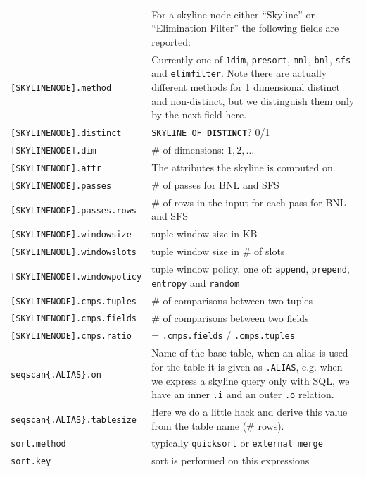 \begin{table}[htbp]
\begin{tabular*}{\textwidth}{@{\extracolsep{\fill}}p{\fixedcolumnwidth}@{\extracolsep{\fill}}p{\paragraphcolumnwidth}}
\hline
					& For a skyline node either ``Skyline'' or ``Elimination Filter'' the following fields are reported: \\
\verb|[SKYLINENODE].method|		& Currently one of \texttt{1dim}, \texttt{presort}, \texttt{mnl}, \texttt{bnl}, \texttt{sfs} and \texttt{elimfilter}. Note there are actually different methods for 1 dimensional distinct and non-distinct, but we distinguish them only by the next field here.\\
\verb|[SKYLINENODE].distinct|		& \texttt{SKYLINE OF \textbf{DISTINCT}}? 0/1\\
\verb|[SKYLINENODE].dim|		& \# of dimensions: $1, 2, \ldots$ \\
\verb|[SKYLINENODE].attr|		& The attributes the skyline is computed on.\\
\verb|[SKYLINENODE].passes|		& \# of passes for BNL and SFS\\
\verb|[SKYLINENODE].passes.rows|	& \# of rows in the input for each pass for BNL and SFS\\
\verb|[SKYLINENODE].windowsize|		& tuple window size in KB\\
\verb|[SKYLINENODE].windowslots|	& tuple window size in \# of slots\\
\verb|[SKYLINENODE].windowpolicy|	& tuple window policy, one of: \texttt{append}, \texttt{prepend}, \texttt{entropy} and \texttt{random}\\
\verb|[SKYLINENODE].cmps.tuples|	& \# of comparisons between two tuples\\
\verb|[SKYLINENODE].cmps.fields|	& \# of comparisons between two fields\\
\verb|[SKYLINENODE].cmps.ratio|		& = \texttt{.cmps.fields} / \texttt{.cmps.tuples}\\

\hline

\verb|seqscan{.ALIAS}.on|		& Name of the base table, when an alias is used for the table it is given as \texttt{.ALIAS}, e.g. when we express a skyline query only with SQL, we have an inner \texttt{.i} and an outer \texttt{.o} relation.\\
\verb|seqscan{.ALIAS}.tablesize|	& Here we do a little hack and derive this value from the table name (\# rows). \\

\hline

\verb|sort.method|			& typically \texttt{quicksort} or \texttt{external merge}\\
\verb|sort.key|				& sort is performed on this expressions\\


\end{tabular*}
\end{table}
